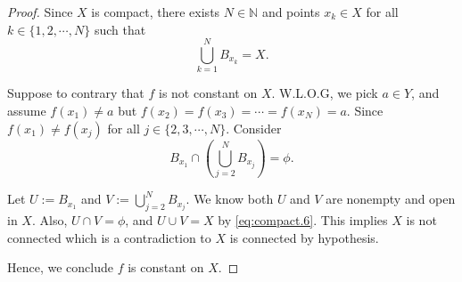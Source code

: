 \begin{Exercise}
\begin{proof}
Since $X$ is compact, there exists $N\in\mathbb{N}$ and points $x_k\in X$ for all $k\in\{1,2,\cdots,N\}$ such that
\begin{equation}\label{eq:compact.6}
\bigcup_{k=1}^{N} B_{x_k} = X.
\end{equation}

Suppose to contrary that $f$ is not constant on $X$. W.L.O.G, we pick $a\in Y$, and assume $f(x_1) \neq a$ but $f(x_2) = f(x_3) = \cdots = f(x_N) = a$.
Since $f(x_1) \neq f(x_j)$ for all $j\in\{2,3,\cdots,N\}$. Consider
$$
B_{x_1}\cap \left( \bigcup_{j=2}^{N} B_{x_j} \right) = \phi.
$$

Let $U := B_{x_1}$ and $V := \bigcup_{j=2}^{N} B_{x_j}$. We know both $U$ and $V$ are nonempty and open in $X$. Also, $U\cap V=\phi$, and $U\cup V = X$ by \eqref{eq:compact.6}. This implies $X$ is not connected which is a contradiction to $X$ is connected by hypothesis.

Hence, we conclude $f$ is constant on $X$.
\end{proof}
\end{Exercise}